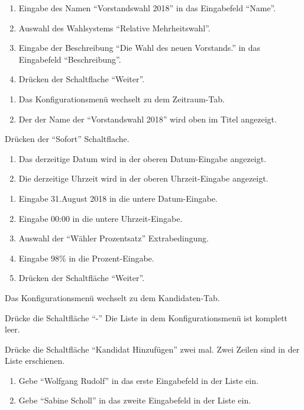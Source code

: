\documentclass[parskip=full]{scrartcl}
\begin{document}
\teststep{}
		{\begin{enumerate}
				\item Eingabe des Namen \enquote{Vorstandswahl 2018} in das Eingabefeld \enquote{Name}.
				\item Auswahl des Wahlsystems \enquote{Relative Mehrheitswahl}.
				\item Eingabe der Beschreibung \enquote{Die Wahl des neuen Vorstands.} in das Eingabefeld \enquote{Beschreibung}.
				\item Drücken der Schaltflache \enquote{Weiter}.
		\end{enumerate}}
		{\begin{enumerate}
				\item Das Konfigurationsmenü wechselt zu dem Zeitraum-Tab.
				\item Der der Name der \enquote{Vorstandswahl 2018} wird oben im Titel angezeigt.
		\end{enumerate}}

\teststep{}
		{Drücken der \enquote{Sofort} Schaltflache.}
		{\begin{enumerate}
				\item Das derzeitige Datum wird in der oberen Datum-Eingabe angezeigt.
				\item Die derzeitige Uhrzeit wird in der oberen Uhrzeit-Eingabe angezeigt.
		\end{enumerate}}
	
\teststep{}
		{\begin{enumerate}
				\item Eingabe 31.August 2018 in die untere Datum-Eingabe.
				\item Eingabe 00:00 in die untere Uhrzeit-Eingabe.
				\item Auswahl der \enquote{Wähler Prozentsatz} Extrabedingung.
				\item Eingabe 98\% in die Prozent-Eingabe.
				\item Drücken der Schaltfläche \enquote{Weiter}.
		\end{enumerate}}
		{Das Konfigurationsmenü wechselt zu dem Kandidaten-Tab.}

\teststep{}
		{Drücke die Schaltfläche \enquote{-}}
		{Die Liste in dem Konfigurationsmenü ist komplett leer.}
		
\teststep{}
		{Drücke die Schaltfläche \enquote{Kandidat Hinzufügen} zwei mal.}
		{Zwei Zeilen sind in der Liste erschienen.}
	
\teststep{}
		{\begin{enumerate}
			\item Gebe \enquote{Wolfgang Rudolf} in das erste Eingabefeld in der Liste ein.
			\item Gebe \enquote{Sabine Scholl} in das zweite Eingabefeld in der Liste ein.
		\end{enumerate}}
		{}
\end{document}
